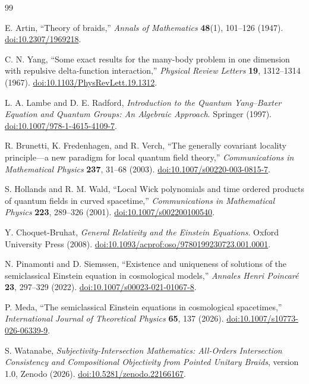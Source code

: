 \documentclass[11pt]{article}
\theoremstyle{definition}
\theoremstyle{remark}
\begin{document}
\begin{thebibliography}{99}

E. Artin, ``Theory of braids,'' \emph{Annals of Mathematics} \textbf{48}(1), 101--126 (1947). \href{https://doi.org/10.2307/1969218}{doi:10.2307/1969218}.

C. N. Yang, ``Some exact results for the many-body problem in one dimension with repulsive delta-function interaction,'' \emph{Physical Review Letters} \textbf{19}, 1312--1314 (1967). \href{https://doi.org/10.1103/PhysRevLett.19.1312}{doi:10.1103/PhysRevLett.19.1312}.

L. A. Lambe and D. E. Radford, \emph{Introduction to the Quantum Yang--Baxter Equation and Quantum Groups: An Algebraic Approach}. Springer (1997). \href{https://doi.org/10.1007/978-1-4615-4109-7}{doi:10.1007/978-1-4615-4109-7}.

R. Brunetti, K. Fredenhagen, and R. Verch, ``The generally covariant locality principle---a new paradigm for local quantum field theory,'' \emph{Communications in Mathematical Physics} \textbf{237}, 31--68 (2003). \href{https://doi.org/10.1007/s00220-003-0815-7}{doi:10.1007/s00220-003-0815-7}.

S. Hollands and R. M. Wald, ``Local Wick polynomials and time ordered products of quantum fields in curved spacetime,'' \emph{Communications in Mathematical Physics} \textbf{223}, 289--326 (2001). \href{https://doi.org/10.1007/s002200100540}{doi:10.1007/s002200100540}.

Y. Choquet-Bruhat, \emph{General Relativity and the Einstein Equations}. Oxford University Press (2008). \href{https://doi.org/10.1093/acprof:oso/9780199230723.001.0001}{doi:10.1093/acprof:oso/9780199230723.001.0001}.

N. Pinamonti and D. Siemssen, ``Existence and uniqueness of solutions of the semiclassical Einstein equation in cosmological models,'' \emph{Annales Henri Poincar\'e} \textbf{23}, 297--329 (2022). \href{https://doi.org/10.1007/s00023-021-01067-8}{doi:10.1007/s00023-021-01067-8}.

P. Meda, ``The semiclassical Einstein equations in cosmological spacetimes,'' \emph{International Journal of Theoretical Physics} \textbf{65}, 137 (2026). \href{https://doi.org/10.1007/s10773-026-06339-9}{doi:10.1007/s10773-026-06339-9}.

S. Watanabe, \emph{Subjectivity-Intersection Mathematics: All-Orders Intersection Consistency and Compositional Objectivity from Pointed Unitary Braids}, version 1.0, Zenodo (2026). \href{https://doi.org/10.5281/zenodo.22166167}{doi:10.5281/zenodo.22166167}.


\end{thebibliography}
\end{document}
